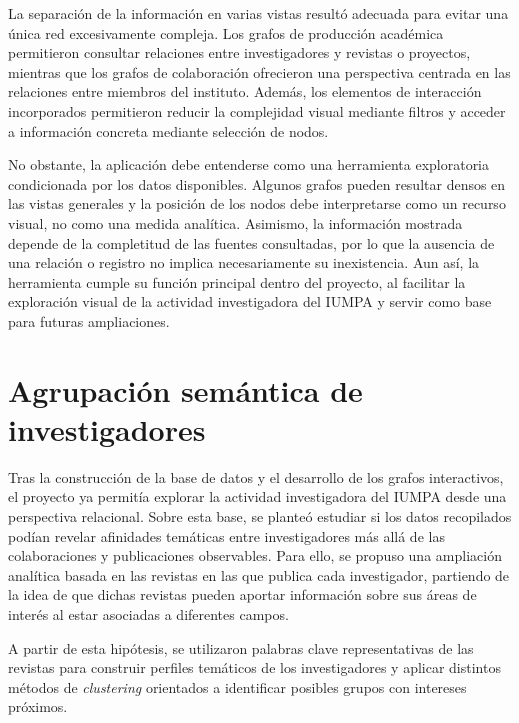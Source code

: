 \documentclass[11pt,spanish,listoffigures,listoftables]{tfgetsinf}
\begin{document}
La separación de la información en varias vistas resultó adecuada para evitar una única red excesivamente compleja. Los grafos de producción académica permitieron consultar relaciones entre investigadores y revistas o proyectos, mientras que los grafos de colaboración ofrecieron una perspectiva centrada en las relaciones entre miembros del instituto. Además, los elementos de interacción incorporados permitieron reducir la complejidad visual mediante filtros y acceder a información concreta mediante selección de nodos.

No obstante, la aplicación debe entenderse como una herramienta exploratoria condicionada por los datos disponibles. Algunos grafos pueden resultar densos en las vistas generales y la posición de los nodos debe interpretarse como un recurso visual, no como una medida analítica. Asimismo, la información mostrada depende de la completitud de las fuentes consultadas, por lo que la ausencia de una relación o registro no implica necesariamente su inexistencia. Aun así, la herramienta cumple su función principal dentro del proyecto, al facilitar la exploración visual de la actividad investigadora del IUMPA y servir como base para futuras ampliaciones.



\chapter{Agrupación semántica de investigadores}

Tras la construcción de la base de datos y el desarrollo de los grafos interactivos, el proyecto ya permitía explorar la actividad investigadora del IUMPA desde una perspectiva relacional. Sobre esta base, se planteó estudiar si los datos recopilados podían revelar afinidades temáticas entre investigadores más allá de las colaboraciones y publicaciones observables. Para ello, se propuso una ampliación analítica basada en las revistas en las que publica cada investigador, partiendo de la idea de que dichas revistas pueden aportar información sobre sus áreas de interés al estar asociadas a diferentes campos.

A partir de esta hipótesis, se utilizaron palabras clave representativas de las revistas para construir perfiles temáticos de los investigadores y aplicar distintos métodos de \textit{clustering} orientados a identificar posibles grupos con intereses próximos.
\end{document}
